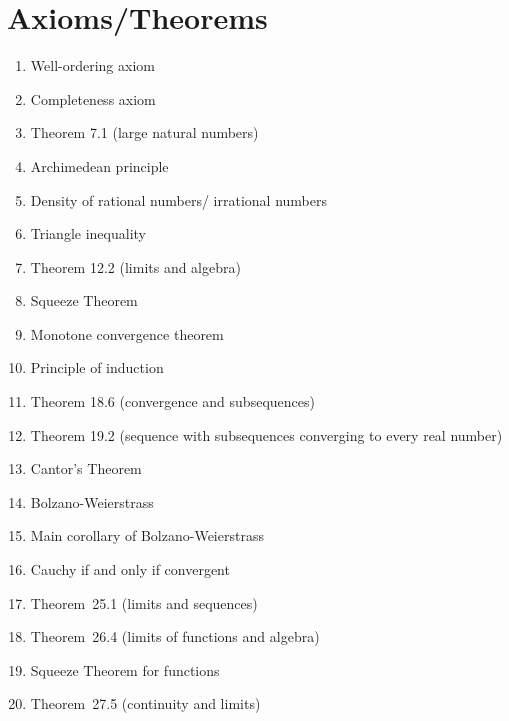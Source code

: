 \documentclass[12pt]{amsart}
\begin{document}
\section*{Axioms/Theorems}

\begin{enumerate}
	\item Well-ordering axiom
	\item Completeness axiom
	\item Theorem 7.1 (large natural numbers)
	\item Archimedean principle
	\item Density of rational numbers/ irrational numbers
	\item Triangle inequality
	\item Theorem 12.2 (limits and algebra)
	\item Squeeze Theorem
	\item Monotone convergence theorem
	\item Principle of induction
	\item Theorem 18.6 (convergence and subsequences)
	\item Theorem 19.2 (sequence with subsequences converging to every real number)
	\item Cantor's Theorem

	\item Bolzano-Weierstrass

	\item Main corollary of Bolzano-Weierstrass
	\item Cauchy if and only if convergent

	\item Theorem~25.1 (limits and sequences)
	\item Theorem~26.4 (limits of functions and algebra)
	\item Squeeze Theorem for functions

	\item Theorem~27.5 (continuity and limits)
		\begin{comment}
	\item Theorem~23.1 (continuity and algebra)
	\item Theorem~23.2 (continuity and compositions)
	\item Intermediate Value Theorem
	\item Boundedness Theorem
	\item Extreme Value Theorem
	\item Derivatives and algebra (Theorem 28.1)
	\item Chain rule (Theorem 28.4)
	\item Min-Max Theorem
	\item Mean Value Theorem
	\item Increasing/decreasing functions and derivatives (Corollary 30.5)
\end{comment}
\end{enumerate}
\end{document}
